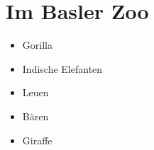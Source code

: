 \section{Im Basler Zoo}

\begin{itemize}
 
\item Gorilla
 
\item Indische Elefanten
 
\item Leuen

\item Bären

\item Giraffe

\end{itemize}
   

